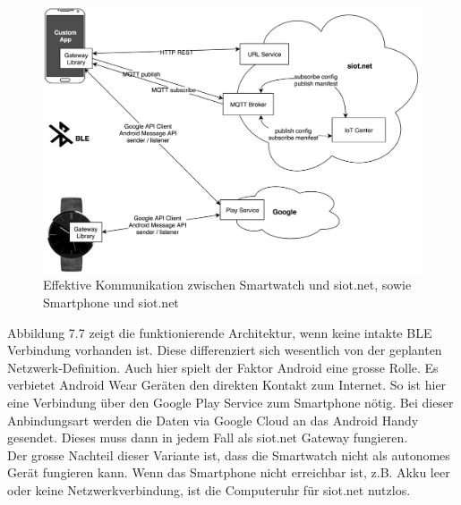 \newpage
\begin{figure}[h]
  \centering
  \includegraphics[scale=0.15]{98_Bilder/07_Architektur/04_Architektur}
  \caption[Effektive Netzwerk-Architektur ohne BLE/mit WLAN]{Effektive Kommunikation zwischen Smartwatch und siot.net, sowie Smartphone und siot.net}
\end{figure}
Abbildung 7.7 zeigt die funktionierende Architektur, wenn keine intakte \gls{BLE} Verbindung vorhanden ist. Diese differenziert sich wesentlich von der geplanten Netzwerk-Definition. Auch hier spielt der Faktor Android eine grosse Rolle. Es verbietet Android Wear Geräten den direkten Kontakt zum Internet. So ist hier eine Verbindung über den Google Play Service zum Smartphone nötig. Bei dieser Anbindungsart werden die Daten via Google Cloud an das Android Handy gesendet. Dieses muss dann in jedem Fall als siot.net Gateway fungieren.\\
Der grosse Nachteil dieser Variante ist, dass die Smartwatch nicht als autonomes Gerät fungieren kann. Wenn das Smartphone nicht erreichbar ist, z.B. Akku leer oder keine Netzwerkverbindung, ist die Computeruhr für siot.net nutzlos.
